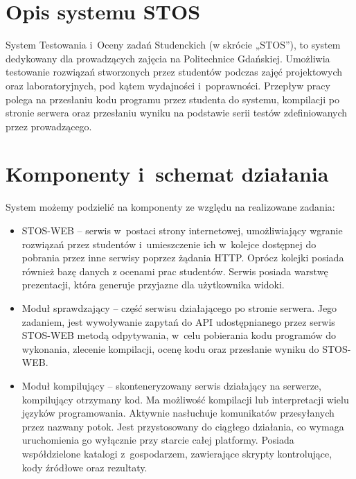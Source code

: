 \section{Opis systemu STOS}
\indent System Testowania i~Oceny zadań Studenckich (w skrócie „STOS”), to system dedykowany dla prowadzących zajęcia na Politechnice Gdańskiej. Umożliwia testowanie rozwiązań stworzonych przez studentów podczas zajęć projektowych oraz laboratoryjnych, pod kątem wydajności i~poprawności. Przepływ pracy polega na przesłaniu kodu programu przez studenta do systemu, kompilacji po stronie serwera oraz przesłaniu wyniku na podstawie serii testów zdefiniowanych przez prowadzącego.

\section{Komponenty i~schemat działania}
System możemy podzielić na komponenty ze względu na realizowane zadania:
\begin{itemize}
    \item STOS-WEB -- serwis w~postaci strony internetowej, umożliwiający wgranie rozwiązań przez studentów i~umieszczenie ich w~kolejce dostępnej do pobrania przez inne serwisy poprzez żądania HTTP. Oprócz kolejki posiada również bazę danych z ocenami prac studentów. Serwis posiada warstwę prezentacji, która generuje przyjazne dla użytkownika widoki.
    \item Moduł sprawdzający -- część serwisu działającego po stronie serwera. Jego zadaniem, jest wywoływanie zapytań do API udostępnianego przez serwis STOS-WEB metodą odpytywania, w~celu pobierania kodu programów do wykonania, zlecenie kompilacji, ocenę kodu oraz przesłanie wyniku do STOS-WEB.
    \item Moduł kompilujący -- skonteneryzowany serwis działający na serwerze, kompilujący otrzymany kod. Ma możliwość kompilacji lub interpretacji wielu języków programowania. Aktywnie nasłuchuje komunikatów przesyłanych przez nazwany potok. Jest przystosowany do ciągłego działania, co wymaga uruchomienia go wyłącznie przy starcie całej platformy. Posiada współdzielone katalogi z~gospodarzem, zawierające skrypty kontrolujące, kody źródłowe oraz rezultaty.
\end{itemize}
